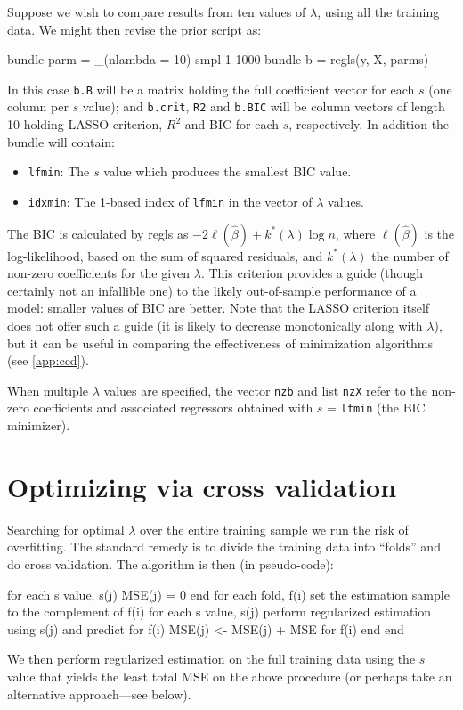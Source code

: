 \documentclass{article}
\begin{document}
Suppose we wish to compare results from ten values of $\lambda$,
using all the training data. We might then revise the prior script as:
\begin{code}
bundle parm = _(nlambda = 10)
smpl 1 1000
bundle b = regls(y, X, parms)
\end{code}

In this case \texttt{b.B} will be a matrix holding the full
coefficient vector for each $s$ (one column per $s$ value); and
\texttt{b.crit}, \texttt{R2} and \texttt{b.BIC} will be column
vectors of length 10 holding LASSO criterion, $R^2$ and BIC for each
$s$, respectively. In addition the bundle will contain:
\begin{itemize}
\item \texttt{lfmin}: The $s$ value which produces the smallest BIC
  value.
\item \texttt{idxmin}: The 1-based index of \texttt{lfmin} in the
  vector of $\lambda$ values.
\end{itemize}

The BIC \citep{schwarz78} is calculated by \textsf{regls} as
$-2\ell(\hat{\beta}) + k^*(\lambda) \log n$, where $\ell(\hat{\beta})$
is the log-likelihood, based on the sum of squared residuals, and
$k^*(\lambda)$ the number of non-zero coefficients for the given
$\lambda$. This criterion provides a guide (though certainly not an
infallible one) to the likely out-of-sample performance of a model:
smaller values of BIC are better. Note that the LASSO criterion itself
does not offer such a guide (it is likely to decrease monotonically
along with $\lambda$), but it can be useful in comparing the
effectiveness of minimization algorithms (see \ref{app:ccd}).

When multiple $\lambda$ values are specified, the vector \texttt{nzb}
and list \texttt{nzX} refer to the non-zero coefficients and
associated regressors obtained with $s$ = \texttt{lfmin} (the BIC
minimizer).

\section{Optimizing via cross validation}
\label{sec:xvalid}

Searching for optimal $\lambda$ over the entire training sample we run
the risk of overfitting. The standard remedy is to divide the training
data into ``folds'' and do cross validation. The algorithm is then (in
pseudo-code):
\begin{code}
for each s value, s(j)
  MSE(j) = 0
end
for each fold, f(i)
  set the estimation sample to the complement of f(i)
  for each s value, s(j)
    perform regularized estimation using s(j) and predict for f(i)
    MSE(j) <- MSE(j) + MSE for f(i)
  end
end
\end{code}
We then perform regularized estimation on the full training data using the
$s$ value that yields the least total MSE on the above procedure (or
perhaps take an alternative approach---see below).
\end{document}
